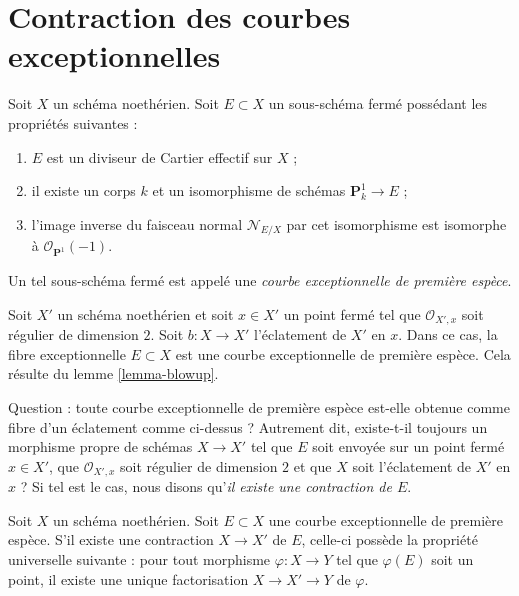 \section{Contraction des courbes exceptionnelles} \label{section-minus-one}

\noindent Soit $X$ un schéma noethérien. Soit $E \subset X$ un sous-schéma fermé possédant les propriétés suivantes : \begin{enumerate} \item $E$ est un diviseur de Cartier effectif sur $X$ ; \item il existe un corps $k$ et un isomorphisme de schémas $\mathbf{P}^1_k \to E$ ; \item l'image inverse du faisceau normal $\mathcal{N}_{E/X}$ par cet isomorphisme est isomorphe à $\mathcal{O}_{\mathbf{P}^1}(-1)$. \end{enumerate} Un tel sous-schéma fermé est appelé une {\it courbe exceptionnelle de première espèce}.

\medskip\noindent Soit $X'$ un schéma noethérien et soit $x \in X'$ un point fermé tel que $\mathcal{O}_{X', x}$ soit régulier de dimension $2$. Soit $b : X \to X'$ l'éclatement de $X'$ en $x$. Dans ce cas, la fibre exceptionnelle $E \subset X$ est une courbe exceptionnelle de première espèce. Cela résulte du lemme \ref{lemma-blowup}.

\medskip\noindent Question : toute courbe exceptionnelle de première espèce est-elle obtenue comme fibre d'un éclatement comme ci-dessus ? Autrement dit, existe-t-il toujours un morphisme propre de schémas $X \to X'$ tel que $E$ soit envoyée sur un point fermé $x \in X'$, que $\mathcal{O}_{X', x}$ soit régulier de dimension $2$ et que $X$ soit l'éclatement de $X'$ en $x$ ? Si tel est le cas, nous disons qu'{\it il existe une contraction de $E$}.

\begin{lemma} \label{lemma-factor-through-contraction} Soit $X$ un schéma noethérien. Soit $E \subset X$ une courbe exceptionnelle de première espèce. S'il existe une contraction $X \to X'$ de $E$, celle-ci possède la propriété universelle suivante : pour tout morphisme $\varphi : X \to Y$ tel que $\varphi(E)$ soit un point, il existe une unique factorisation $X \to X' \to Y$ de $\varphi$. \end{lemma}

